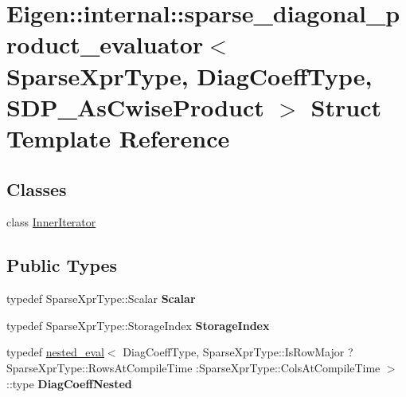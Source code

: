 \hypertarget{struct_eigen_1_1internal_1_1sparse__diagonal__product__evaluator_3_01_sparse_xpr_type_00_01_diag5c533b27b8fe485cf13e7ad699b99003}{}\section{Eigen\+::internal\+::sparse\+\_\+diagonal\+\_\+product\+\_\+evaluator$<$ Sparse\+Xpr\+Type, Diag\+Coeff\+Type, S\+D\+P\+\_\+\+As\+Cwise\+Product $>$ Struct Template Reference}
\label{struct_eigen_1_1internal_1_1sparse__diagonal__product__evaluator_3_01_sparse_xpr_type_00_01_diag5c533b27b8fe485cf13e7ad699b99003}
\subsection*{Classes}
\begin{DoxyCompactItemize}
\item 
class \mbox{\hyperlink{class_eigen_1_1internal_1_1sparse__diagonal__product__evaluator_3_01_sparse_xpr_type_00_01_diag_f44167c623880e382ac76ec71f78299c}{Inner\+Iterator}}
\end{DoxyCompactItemize}
\subsection*{Public Types}
\begin{DoxyCompactItemize}
\item 
\mbox{\label{struct_eigen_1_1internal_1_1sparse__diagonal__product__evaluator_3_01_sparse_xpr_type_00_01_diag5c533b27b8fe485cf13e7ad699b99003_a3cc0c942755594bbab6d47924f9f4d90}} 
typedef Sparse\+Xpr\+Type\+::\+Scalar {\bfseries Scalar}
\item 
\mbox{\label{struct_eigen_1_1internal_1_1sparse__diagonal__product__evaluator_3_01_sparse_xpr_type_00_01_diag5c533b27b8fe485cf13e7ad699b99003_ac566430035277187cbefefe893d20e5b}} 
typedef Sparse\+Xpr\+Type\+::\+Storage\+Index {\bfseries Storage\+Index}
\item 
\mbox{\label{struct_eigen_1_1internal_1_1sparse__diagonal__product__evaluator_3_01_sparse_xpr_type_00_01_diag5c533b27b8fe485cf13e7ad699b99003_a5643daa5d8bda695a2452f53a3bf0c17}} 
typedef \mbox{\hyperlink{struct_eigen_1_1internal_1_1nested__eval}{nested\+\_\+eval}}$<$ Diag\+Coeff\+Type, Sparse\+Xpr\+Type\+::\+Is\+Row\+Major ? Sparse\+Xpr\+Type\+::\+Rows\+At\+Compile\+Time \+:Sparse\+Xpr\+Type\+::\+Cols\+At\+Compile\+Time $>$\+::type {\bfseries Diag\+Coeff\+Nested}
\end{DoxyCompactItemize}
